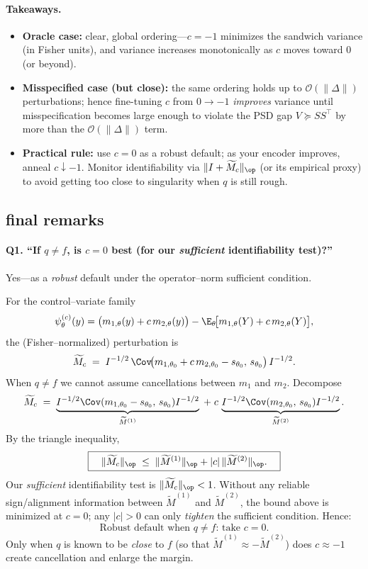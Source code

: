 \paragraph{Takeaways.}
\begin{itemize}
\item \textbf{Oracle case:} clear, global ordering—$c=-1$ minimizes the sandwich variance (in Fisher units), and variance increases monotonically as \(c\) moves toward \(0\) (or beyond).
\item \textbf{Misspecified case (but close):} the same ordering holds up to $\mathcal O(\|\Delta\|)$ perturbations; hence fine-tuning \(c\) from \(0\to -1\) \emph{improves} variance until misspecification becomes large enough to violate the PSD gap \(V\succeq SS^\top\) by more than the $\mathcal O(\|\Delta\|)$ term.
\item \textbf{Practical rule:} use \(c=0\) as a robust default; as your encoder improves, anneal \(c\downarrow -1\). Monitor identifiability via \(\|I+\widetilde M_c\|_{\op}\) (or its empirical proxy) to avoid getting too close to singularity when $q$ is still rough.
\end{itemize}


\subsection{final remarks}
\paragraph{Q1. “If $q\neq f$, is $c=0$ best (for our \emph{sufficient} identifiability test)?”}
Yes—as a \emph{robust} default under the operator–norm sufficient condition.

For the control–variate family
\[
\psi^{(c)}_\theta(y)
=\big(m_{1,\theta}(y)+c\,m_{2,\theta}(y)\big)
-\E_\theta\!\big[m_{1,\theta}(Y)+c\,m_{2,\theta}(Y)\big],
\]
the (Fisher–normalized) perturbation is
\[
\widetilde M_c \;=\; I^{-1/2}\,\Cov\!\big(m_{1,\theta_0}+c\,m_{2,\theta_0}-s_{\theta_0},\,s_{\theta_0}\big)\,I^{-1/2}.
\]
When $q\neq f$ we cannot assume cancellations between $m_1$ and $m_2$. Decompose
\[
\widetilde M_c \;=\; \underbrace{I^{-1/2}\Cov(m_{1,\theta_0}-s_{\theta_0},\,s_{\theta_0})I^{-1/2}}_{\widetilde M^{(1)}}
\;+\; c\,\underbrace{I^{-1/2}\Cov(m_{2,\theta_0},\,s_{\theta_0})I^{-1/2}}_{\widetilde M^{(2)}}.
\]
By the triangle inequality,
\[
\boxed{\quad \|\widetilde M_c\|_{\op} \;\le\; \|\widetilde M^{(1)}\|_{\op} + |c|\,\|\widetilde M^{(2)}\|_{\op}. \quad}
\]
Our \emph{sufficient} identifiability test is $\|\widetilde M_c\|_{\op}<1$.  
Without any reliable sign/alignment information between $\widetilde M^{(1)}$ and $\widetilde M^{(2)}$, the bound above is minimized at $c=0$; any $|c|>0$ can only \emph{tighten} the sufficient condition. Hence:
\[
\boxed{\text{Robust default when $q\neq f$: take } c=0.}
\]
Only when $q$ is known to be \emph{close} to $f$ (so that $\widetilde M^{(1)}\approx -\widetilde M^{(2)}$) does $c\approx -1$ create cancellation and enlarge the margin.

